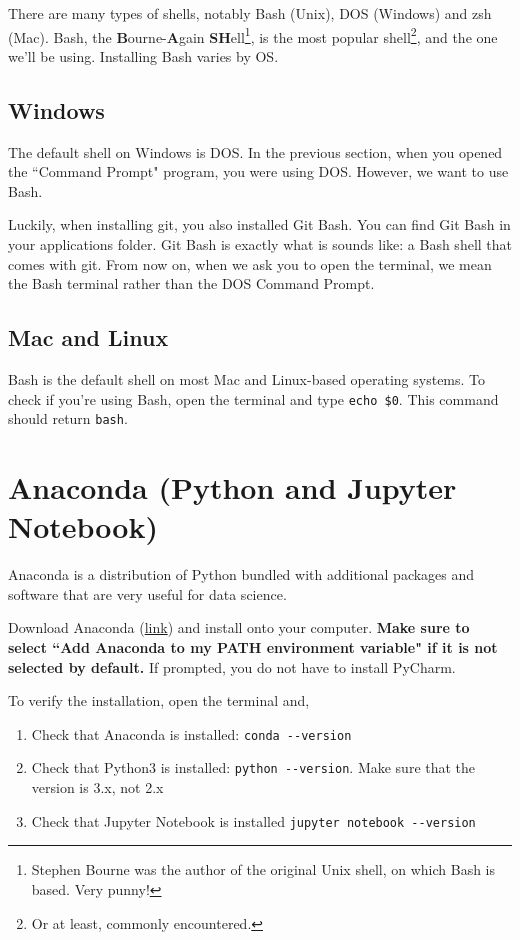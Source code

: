\documentclass[12pt]{article}
\numberwithin{equation}{section}
\begin{document}
	There are many types of shells, notably Bash (Unix), DOS (Windows) and zsh (Mac). Bash, the \textbf{B}ourne-\textbf{A}gain \textbf{SH}ell\footnote{Stephen Bourne was the author of the original Unix shell, on which Bash is based. Very punny!}, is the most popular shell\footnote{Or at least, commonly encountered.}, and the one we'll be using. Installing Bash varies by OS.
	
	\subsection{Windows}
	The default shell on Windows is DOS.  In the previous section, when you opened the ``Command Prompt" program, you were using DOS. However, we want to use Bash.
	
	Luckily, when installing git, you also installed Git Bash. You can find Git Bash in your applications folder. Git Bash is exactly what is sounds like: a Bash shell that comes with git. From now on, when we ask you to open the terminal, we mean the Bash terminal rather than the DOS Command Prompt.
	
	\subsection{Mac and Linux}
	Bash is the default shell on most Mac and Linux-based operating systems. To check if you're using Bash, open the terminal and type \verb|echo $0|. This command should return \verb|bash|. 
	
	\section{Anaconda (Python and Jupyter Notebook)}
	
	Anaconda is a distribution of Python bundled with additional packages and software that are very useful for data science. 
	
	Download Anaconda (\hyperref{https://www.anaconda.com/products/individual}{}{}{link}) and install onto your computer.  \textbf{Make sure to select ``Add Anaconda to my PATH environment variable" if it is not selected by default.} If prompted, you do not have to install PyCharm.
	
	To verify the installation, open the terminal and,
	\begin{enumerate}
		\item Check that Anaconda is installed: \verb|conda --version|
		\item Check that Python3 is installed: \verb|python --version|. Make sure that the version is 3.x, not 2.x
		\item Check that Jupyter Notebook is installed \verb|jupyter notebook --version|
	\end{enumerate}
	
\end{document}
